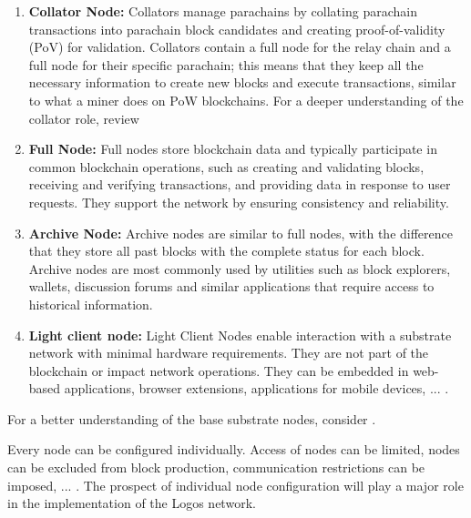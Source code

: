 \documentclass[]{article}
\begin{document}
\begin{enumerate}[label=\textbullet]
	\item\textbf{Collator Node:} 
	Collators manage parachains by collating parachain transactions into parachain block candidates and creating proof-of-validity (PoV) for validation.
	Collators contain a full node for the relay chain and a full node for their specific parachain; this means that they keep all the necessary information to create new blocks and execute transactions, similar to what a miner does on PoW blockchains.
	For a deeper understanding of the collator role, review \cite{PolkadotDoc-collator}
	
	\item\textbf{Full Node:}
	Full nodes store blockchain data and typically participate in common blockchain operations, such as creating and validating blocks, receiving and verifying transactions, and providing data in response to user requests. 
	They support the network by ensuring consistency and reliability. 

	\item\textbf{Archive Node:} 
	Archive nodes are similar to full nodes, with the difference that they store all past blocks with the complete status for each block. 
	Archive nodes are most commonly used by utilities such as block explorers, wallets, discussion forums and similar applications that require access to historical information.     
	
	\item\textbf{Light client node:} 
    Light Client Nodes enable interaction with a substrate network with minimal hardware requirements. They are not part of the blockchain or impact network operations. 
    They can be embedded in web-based applications, browser extensions, applications for mobile devices, ... .      
\end{enumerate}
For a better understanding of the base substrate nodes, consider \cite{SubstrateDoc-node}.

Every node can be configured individually. 
Access of nodes can be limited, nodes can be excluded from block production, communication restrictions can be imposed, ... .
The prospect of individual node configuration will play a major role in the implementation of the Logos network.

\end{document}

